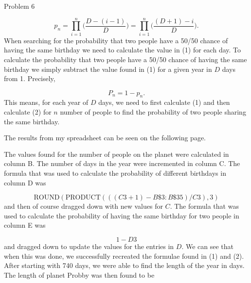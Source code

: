 \begin{problem}{Problem 6}
\begin{Highlight}[Solution]
        \setcounter{equation}{0}
        \begin{equation}
            p_{n} = \prod_{i = 1}^{n} \Biggl(\frac{D - (i - 1)}{D}\Biggr) = \prod_{i = 1}^{n} \Biggl(\frac{(D + 1) - i}{D}\Biggr).
        \end{equation}
        When searching for the probability that two people have a 50/50 chance of having the same birthday we need to calculate the value in (1) for each day. To calculate the probability that two
        people have a 50/50 chance of having the same birthday we simply subtract the value found in (1) for a given year in $D$ days from 1. Precisely,

        \begin{equation}
            P_{n} = 1 - p_{n}.
        \end{equation}
        This means, for each year of $D$ days, we need to first calculate (1) and then calculate (2) for $n$ number of people to find the probability of two people sharing the same birthday.

        The results from my spreadsheet can be seen on the following page.
    \end{Highlight}
    \clearpage  \clearpage
    \begin{Highlight}
        The values found for the number of people on the planet were calculated in column B. The number of days in the year were incremented in column C. The formula that was used to calculate the
        probability of different birthdays in column D was

        \begin{equation}
            \text{ROUND}(\text{PRODUCT}(((C3+1)-B\$3:B\$35)/C3),3)
        \end{equation}
        and then of course dragged down with new values for $C$. The formula that was used to calculate the probability of having the same birthday for two people in column E was

        \begin{equation}
            1-D3
        \end{equation}
        and dragged down to update the values for the entries in $D$. We can see that when this was done, we successfully recreated the formulae found in (1) and (2). After starting with 740 days,
        we were able to find the length of the year in days. The length of planet Probby was then found to be


\end{Highlight}
\end{problem}
